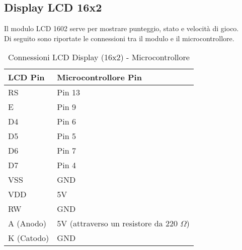 \documentclass[a4paper, 12pt]{article}
\begin{document}
\subsection{Display LCD 16x2}
Il modulo LCD 1602 serve per mostrare punteggio, stato e velocità di gioco.\\
Di seguito sono riportate le connessioni tra il modulo e il microcontrollore.
\begin{table}[H]
    \centering
    \caption{Connessioni LCD Display (16x2) - Microcontrollore}
    \label{tab:lcd-16x2-connections}
    \begin{tabular}{ll}
        \toprule
        \textbf{LCD Pin} & \textbf{Microcontrollore Pin}                  \\
        \midrule
        RS               & Pin 13                                         \\
        E                & Pin 9                                          \\
        D4               & Pin 6                                          \\
        D5               & Pin 5                                          \\
        D6               & Pin 7                                          \\
        D7               & Pin 4                                          \\
        VSS              & GND                                            \\
        VDD              & 5V                                             \\
        RW               & GND                                            \\
        A (Anodo)        & 5V (attraverso un resistore da 220 \(\Omega\)) \\
        K (Catodo)       & GND                                            \\
        \bottomrule
    \end{tabular}
\end{table}
\end{document}
